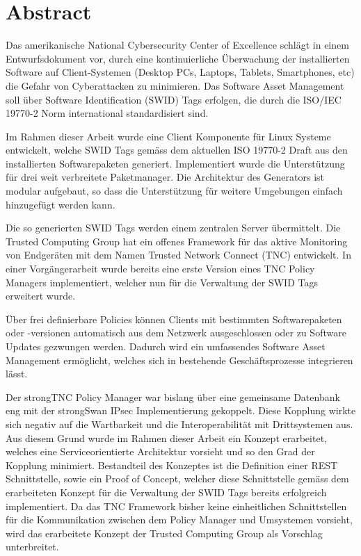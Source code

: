 \chapter{Abstract}

Das amerikanische National Cybersecurity Center of Excellence schlägt in einem
Entwurfsdokument vor, durch eine kontinuierliche Überwachung der installierten
Software auf Client-Systemen (Desktop PCs, Laptops, Tablets, Smartphones, etc)
die Gefahr von Cyberattacken zu minimieren. Das Software Asset Management soll
über Software Identification (SWID) Tags erfolgen, die durch die ISO/IEC 19770-2
Norm international standardisiert sind.

Im Rahmen dieser Arbeit wurde eine Client Komponente für Linux Systeme
entwickelt, welche SWID Tags gemäss dem aktuellen ISO 19770-2 Draft aus den
installierten Softwarepaketen generiert. Implementiert wurde die Unterstützung
für drei weit verbreitete Paketmanager. Die Architektur des Generators ist
modular aufgebaut, so dass die Unterstützung für weitere Umgebungen einfach
hinzugefügt werden kann.

Die so generierten SWID Tags werden einem zentralen Server übermittelt. Die
Trusted Computing Group hat ein offenes Framework für das aktive Monitoring von
Endgeräten mit dem Namen Trusted Network Connect (TNC) entwickelt. In einer
Vorgängerarbeit wurde bereits eine erste Version eines TNC Policy Managers
implementiert, welcher nun für die Verwaltung der SWID Tags erweitert wurde.

Über frei definierbare Policies können Clients mit bestimmten Softwarepaketen
oder -versionen automatisch aus dem Netzwerk ausgeschlossen oder zu Software
Updates gezwungen werden. Dadurch wird ein umfassendes Software Asset Management
ermöglicht, welches sich in bestehende Geschäftsprozesse integrieren lässt.

Der strongTNC Policy Manager war bislang über eine gemeinsame Datenbank eng mit
der strongSwan IPsec Implementierung gekoppelt. Diese Kopplung wirkte sich
negativ auf die Wartbarkeit und die Interoperabilität mit Drittsystemen aus. Aus
diesem Grund wurde im Rahmen dieser Arbeit ein Konzept erarbeitet, welches eine
Serviceorientierte Architektur vorsieht und so den Grad der Kopplung minimiert.
Bestandteil des Konzeptes ist die Definition einer REST Schnittstelle, sowie ein
Proof of Concept, welcher diese Schnittstelle gemäss dem erarbeiteten Konzept für die
Verwaltung der SWID Tags bereits erfolgreich implementiert. Da das TNC Framework
bisher keine einheitlichen Schnittstellen für die Kommunikation zwischen dem
Policy Manager und Umsystemen vorsieht, wird das erarbeitete Konzept der Trusted
Computing Group als Vorschlag unterbreitet.
